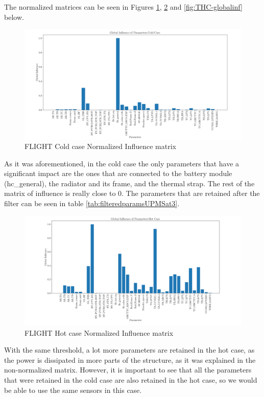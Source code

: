 The normalized matrices can be seen in Figures \ref{fig:FCC-globalinf}, \ref{fig:FHC-globalinf} and \ref{fig:THC-globalinf} below.
\begin{figure}[H]
    \centering
    \includegraphics[width = \linewidth]{Figures/UPMSat3/Flight/Nuevas/globalinfCC.png}
    \caption{FLIGHT Cold case Normalized Influence matrix}
    \label{fig:FCC-globalinf}
\end{figure}
As it was aforementioned, in the cold case the only parameters that have a significant impact are the ones that are connected to the battery module (hc\_general), the radiator and its frame, and the thermal strap. The rest of the matrix of influence is really close to 0. The parameters that are retained after the filter can be seen in table \autoref{tab:filteredparamsUPMSat3}. 
\begin{figure}[H]
    \centering
    \includegraphics[width = \linewidth]{Figures/UPMSat3/Flight/Nuevas/globalinfHC.png}
    \caption{FLIGHT Hot case Normalized Influence matrix}
    \label{fig:FHC-globalinf}   
\end{figure}
With the same threshold, a lot more parameters are retained in the hot case, as the power is dissipated in more parts of the structure, as it was explained in the non-normalized matrix. However, it is important to see that all the parameters that were retained in the cold case are also retained in the hot case, so we would be able to use the same sensors in this case.

